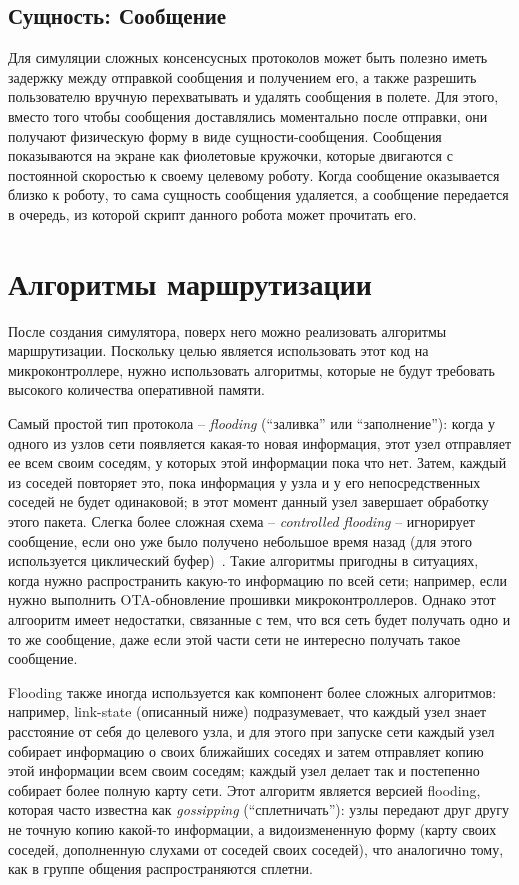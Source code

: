 \documentclass[%
]{report}
\begin{document}
\section{Сущность: Сообщение}

Для симуляции сложных консенсусных протоколов
может быть полезно иметь задержку между отправкой сообщения
и получением его,
а также разрешить пользователю вручную перехватывать и удалять сообщения в полете.
Для этого, вместо того чтобы сообщения доставлялись моментально после отправки,
они получают физическую форму в виде сущности-сообщения.
Сообщения показываются на экране как фиолетовые кружочки,
которые двигаются с постоянной скоростью к своему целевому роботу.
Когда сообщение оказывается близко к роботу,
то сама сущность сообщения удаляется,
а сообщение передается в очередь,
из которой скрипт данного робота может прочитать его.

\chapter{Алгоритмы маршрутизации}

После создания симулятора,
поверх него можно реализовать алгоритмы маршрутизации.
Поскольку целью является использовать этот код на микроконтроллере,
нужно использовать алгоритмы, которые не будут требовать высокого
количества оперативной памяти.

Самый простой тип протокола -- \emph{flooding} (``заливка'' или ``заполнение''):
когда у одного из узлов сети появляется какая-то новая информация,
этот узел отправляет ее всем своим соседям, у которых этой информации пока что нет.
Затем, каждый из соседей повторяет это, пока информация у узла и у его непосредственных соседей
не будет одинаковой;
в этот момент данный узел завершает обработку этого пакета.
Слегка более сложная схема -- \emph{controlled flooding} -- игнорирует сообщение,
если оно уже было получено небольшое время назад (для этого
используется циклический буфер)~\cite{rahman2004controlled}.
Такие алгоритмы пригодны в ситуациях,
когда нужно распространить какую-то информацию по всей сети;
например, если нужно выполнить OTA-обновление прошивки микроконтроллеров.
Однако этот алгооритм имеет недостатки,
связанные с тем, что вся сеть будет получать одно и то же сообщение,
даже если этой части сети не интересно получать такое сообщение.

Flooding также иногда используется как компонент более сложных алгоритмов:
например, link-state (описанный ниже) подразумевает,
что каждый узел знает расстояние от себя до целевого узла,
и для этого при запуске сети каждый узел собирает информацию о своих ближайших соседях
и затем отправляет копию этой информации всем своим соседям;
каждый узел делает так и постепенно собирает более полную карту сети.
Этот алгоритм является версией flooding, которая часто известна как \emph{gossipping}
(``сплетничать''): узлы передают друг другу не точную копию какой-то информации,
а видоизмененную форму (карту своих соседей, дополненную слухами от соседей своих соседей),
что аналогично тому, как в группе общения распространяются сплетни.
\end{document}
